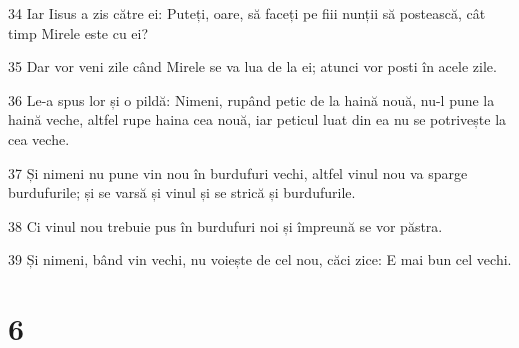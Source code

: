 \par 34 Iar Iisus a zis către ei: Puteți, oare, să faceți pe fiii nunții să postească, cât timp Mirele este cu ei?
\par 35 Dar vor veni zile când Mirele se va lua de la ei; atunci vor posti în acele zile.
\par 36 Le-a spus lor și o pildă: Nimeni, rupând petic de la haină nouă, nu-l pune la haină veche, altfel rupe haina cea nouă, iar peticul luat din ea nu se potrivește la cea veche.
\par 37 Și nimeni nu pune vin nou în burdufuri vechi, altfel vinul nou va sparge burdufurile; și se varsă și vinul și se strică și burdufurile.
\par 38 Ci vinul nou trebuie pus în burdufuri noi și împreună se vor păstra.
\par 39 Și nimeni, bând vin vechi, nu voiește de cel nou, căci zice: E mai bun cel vechi.

\chapter{6}

